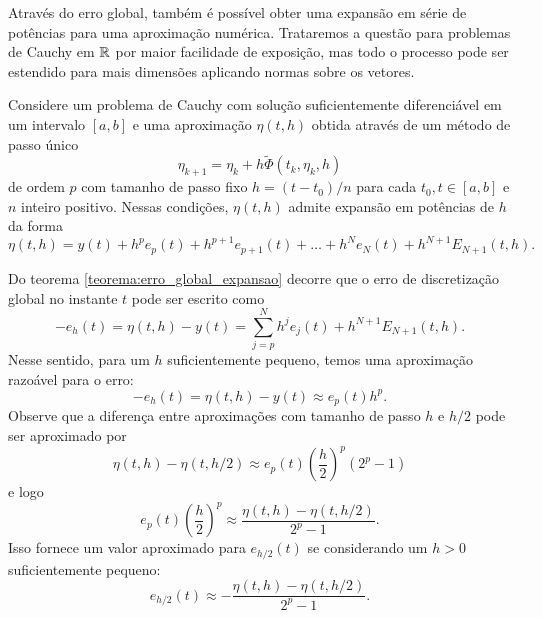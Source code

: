Através do erro global, também é possível obter uma expansão em série de potências para uma aproximação numérica. Trataremos a questão para problemas de Cauchy em $\mathbb{R}$ por maior facilidade de exposição, mas todo o processo pode ser estendido para mais dimensões aplicando normas sobre os vetores.

\begin{theorem}\label{teorema:erro_global_expansao}\citep[30]{alexandre_megiorin_roma_metodos_nodate}
    Considere um problema de Cauchy com solução suficientemente diferenciável em um intervalo $[a,b]$ e uma aproximação $\eta(t,h)$ obtida através de um método de passo único
    \begin{equation*}
        \eta_{k+1} = \eta_k + h \tilde \Phi(t_k, \eta_k, h)
    \end{equation*}
    de ordem $p$ com tamanho de passo fixo $h = (t-t_0)/n$ para cada $t_0, t \in [a,b]$ e $n$ inteiro positivo. Nessas condições, $\eta(t,h)$ admite expansão em potências de $h$ da forma
    \begin{equation*}
        \eta(t,h) = y(t) + h^p e_p (t) + h^{p+1} e_{p+1} (t) + \hdots + h^N e_N(t) + h^{N+1} E_{N+1}(t,h).
    \end{equation*}
\end{theorem}

Do teorema \ref{teorema:erro_global_expansao} decorre que o erro de discretização global no instante $t$ pode ser escrito como
\begin{equation*}
    - e_h (t) = \eta (t,h) - y(t) = \sum_{j=p}^N h^j e_j(t) + h^{N+1} E_{N+1} (t,h).
\end{equation*}
Nesse sentido, para um $h$ suficientemente pequeno, temos uma aproximação razoável para o erro:
\begin{equation*}
    - e_h (t) = \eta (t, h) - y(t) \approx e_p (t) h^p.
\end{equation*}
Observe que a diferença entre aproximações com tamanho de passo $h$ e $h/2$ pode ser aproximado por
\begin{equation*}
    \eta (t, h) - \eta(t, h/2) \approx e_p(t) \left(\dfrac{h}{2}\right)^p (2^p - 1)
\end{equation*}
e logo
\begin{equation*}
    e_p (t) \left(\dfrac{h}{2}\right)^p \approx \dfrac{\eta (t, h) - \eta (t,h/2)}{2^p - 1}.
\end{equation*}
Isso fornece um valor aproximado para $e_{h/2}(t)$ se considerando um $h > 0$ suficientemente pequeno:
\begin{equation*}
    e_{h/2} (t) \approx - \dfrac{\eta(t,h) - \eta(t,h/2)}{2^p -  1}.
\end{equation*}

